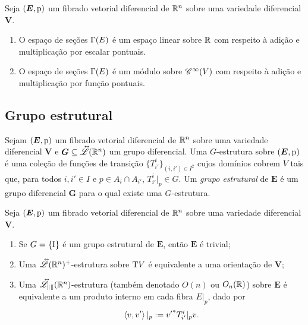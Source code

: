 \begin{exercise}
Seja $(\bm E,\mathrm{p})$ um fibrado vetorial diferencial de $\mathbb{R}^n$ sobre uma variedade diferencial $\bm V$.
	\begin{enumerate}
	\item O espaço de seções $\Gamma(E)$ é um espaço linear sobre $\mathbb{R}$ com respeito à adição e multiplicação por escalar pontuais.
	\item O espaço de seções $\Gamma(E)$ é um módulo sobre $\mathscr{C}^\infty(V)$ com respeito à adição e multiplicação por função pontuais.
	\end{enumerate}
\end{exercise}


\subsection{Grupo estrutural}

\begin{definition}
Sejam $(\bm E,\mathrm{p})$ um fibrado vetorial diferencial de $\mathbb{R}^n$ sobre uma variedade diferencial $\bm V$ e $\bm G \subseteq \accentset{\leftrightarrow}{\mathscr{L}}(\mathbb{R}^n)$ um grupo diferencial. Uma $G$-estrutura sobre $(\bm E,\mathrm{p})$ é uma coleção de funções de transição $\{T^i_{i'}\}_{(i,i') \in I^2}$ cujos domínios cobrem $V$ tais que, para todos $i,i' \in I$ e $p \in A_i \cap A_{i'}$, $T^i_{i'}|_p \in G$. Um \emph{grupo estrutural} de $\bm E$ é um grupo diferencial $\bm G$ para o qual existe uma $G$-estrutura.
\end{definition}

\begin{example}
Seja $(\bm E,\mathrm{p})$ um fibrado vetorial diferencial de $\mathbb{R}^n$ sobre uma variedade diferencial $\bm V$.
	\begin{enumerate}
	\item Se $G=\{\mathrm{I}\}$ é um grupo estrutural de $\bm E$, então $\bm E$ é trivial;
	
	\item Uma $\accentset{\leftrightarrow}{\mathscr{L}}(\mathbb{R}^n)^+$-estrutura sobre $\mathrm{T} V$ é equivalente a uma orientação de $\bm V$;
	
	\item Uma $\accentset{\leftrightarrow}{\mathscr{L}_{\left\Vert{}\right\Vert}}(\mathbb{R}^n)$-estrutura (também denotado $O(n)$ ou  $O_n(\mathbb{R})$) sobre $\bm E$ é equivalente a um produto interno em cada fibra $E|_p$, dado por
		\begin{equation*}
		\left\langle{v},{v'}\right\rangle|_p := {v'}^* T^i_{i'}|_p v.
		\end{equation*}
	\end{enumerate}
\end{example}


